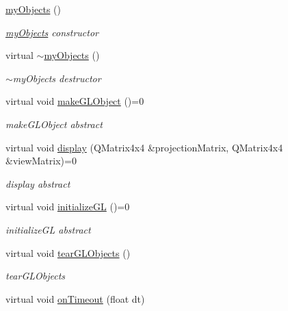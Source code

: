\begin{DoxyCompactItemize}
\item 
\hyperlink{classmyObjects_a6b9ac7cbe04d4c976266ae903ed21aa0}{my\+Objects} ()
\begin{DoxyCompactList}\small\item\em \hyperlink{classmyObjects}{my\+Objects} constructor \end{DoxyCompactList}\item 
virtual \hyperlink{classmyObjects_a5695c2f6428b5b0e9633024d90b84102}{$\sim$my\+Objects} ()
\begin{DoxyCompactList}\small\item\em $\sim$my\+Objects destructor \end{DoxyCompactList}\item 
\mbox{\label{classmyObjects_aeab77bc0741eeba1240ff68218769d16}} 
virtual void \hyperlink{classmyObjects_aeab77bc0741eeba1240ff68218769d16}{make\+G\+L\+Object} ()=0
\begin{DoxyCompactList}\small\item\em make\+G\+L\+Object abstract \end{DoxyCompactList}\item 
virtual void \hyperlink{classmyObjects_a1e24feae7eecc42033706a88afec189b}{display} (Q\+Matrix4x4 \&projection\+Matrix, Q\+Matrix4x4 \&view\+Matrix)=0
\begin{DoxyCompactList}\small\item\em display abstract \end{DoxyCompactList}\item 
\mbox{\label{classmyObjects_a9b5dc2668a3fab5c74fd07e2145f6293}} 
virtual void \hyperlink{classmyObjects_a9b5dc2668a3fab5c74fd07e2145f6293}{initialize\+GL} ()=0
\begin{DoxyCompactList}\small\item\em initialize\+GL abstract \end{DoxyCompactList}\item 
virtual void \hyperlink{classmyObjects_a83118c7f81624026cd3798dcde6a9a34}{tear\+G\+L\+Objects} ()
\begin{DoxyCompactList}\small\item\em tear\+G\+L\+Objects \end{DoxyCompactList}\item 
virtual void \hyperlink{classmyObjects_abe3e3cf13ae4534f3c19701d65d4ccc3}{on\+Timeout} (float dt)

\end{DoxyCompactItemize}
